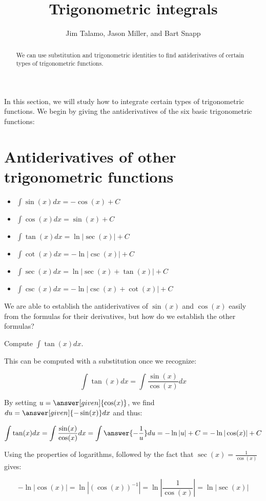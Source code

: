 \documentclass{ximera}
\author{Jim Talamo, Jason Miller, and Bart Snapp}
\title[Dig-In:]{Trigonometric integrals}
\begin{document}
\begin{abstract}
  We can use substitution and trigonometric identities to find antiderivatives of certain types of
  trigonometric functions.
\end{abstract}
\maketitle

In this section, we will study how to integrate certain types of trigonometric functions.  We begin by giving the antiderivatives of the six basic trigonometric functions:


\section{Antiderivatives of other trigonometric functions}

\begin{theorem}\hfil
  \begin{itemize}
  \item $\int \sin(x) dx = - \cos(x)+C$
  \item $\int \cos(x) dx = \sin(x)+C$
  \item $\int \tan(x) dx = \ln|\sec(x)| + C$
  \item $\int \cot(x) dx = -\ln|\csc(x)| + C$
  \item $\int \sec(x) dx = \ln|\sec(x) + \tan(x)| + C$
  \item $\int \csc(x) dx = -\ln|\csc(x) + \cot(x)| + C$
  \end{itemize}
\end{theorem}

We are able to establish the antiderivatives of $\sin(x)$ and $\cos(x)$ easily from the formulas for their derivatives, but how do we establish the other formulas?  

\begin{example}
Compute $\int \tan(x) dx$.

\begin{explanation}
This can be computed with a substitution once we recognize:

\[
\int \tan(x) dx = \int \frac{\sin(x)}{\cos(x)} dx
\]

By setting $u = \answer[given]{\cos(x)}$, we find $du = \answer[given]{-\sin(x)} dx$ and thus:

\[
\int \tan(x) dx = \int \frac{\sin(x)}{\cos(x)} dx =\int \answer{-  \frac{1}{u}} du =-\ln|u|+C = -\ln|\cos(x)|+C
\]

Using the properties of logarithms, followed by the fact that $\sec(x) = \frac{1}{\cos(x)}$ gives:

\[
-\ln|\cos(x)| = \ln \left| (\cos(x))^{-1} \right| = \ln \left| \frac{1}{\cos(x)} \right| = \ln|\sec(x)|
\]
\end{explanation}

\end{example}
 
\end{document}
